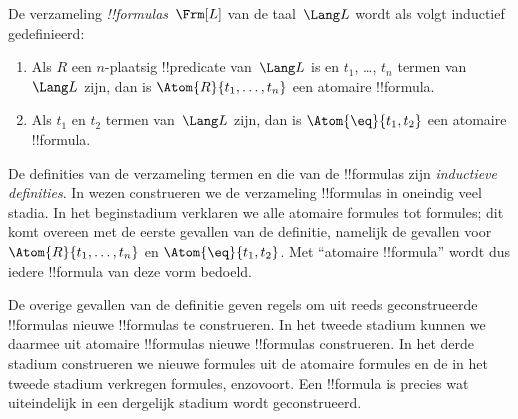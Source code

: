 \documentclass[../../../include/open-logic-section]{subfiles}
\begin{document}
\begin{defn}[Formules]
De verzameling \emph{!!{formula}s}~$\Frm[L]$ van de taal~$\Lang L$
wordt als volgt inductief gedefinieerd:
\begin{enumerate}


\item Als $R$ een $n$-plaatsig !!{predicate} van~$\Lang L$ is en $t_1$, \dots,
  $t_n$ termen van~$\Lang L$ zijn, dan is $\Atom{R}{t_1,\ldots, t_n}$ een
  atomaire !!{formula}.

\item Als $t_1$ en $t_2$ termen van~$\Lang L$ zijn, dan is $\Atom{\eq}{t_1, t_2}$
  een atomaire !!{formula}.








\end{enumerate}
\end{defn}

\begin{explain}
De definities van de verzameling termen en die van de !!{formula}s zijn
\emph{inductieve definities}. In wezen construeren we de verzameling
!!{formula}s in oneindig veel stadia. In het beginstadium verklaren we
alle atomaire formules tot formules; dit komt overeen met de eerste
gevallen van de definitie, namelijk de gevallen voor
%
%
$\Atom{R}{t_1,\dots,t_n}$ en $\Atom{\eq}{t_1,t_2}$. Met ``atomaire
!!{formula}'' wordt dus iedere !!{formula} van deze vorm bedoeld.

De overige gevallen van de definitie geven regels om uit reeds
geconstrueerde !!{formula}s nieuwe !!{formula}s te construeren. In het
tweede stadium kunnen we daarmee uit atomaire !!{formula}s nieuwe
!!{formula}s construeren. In het derde stadium construeren we nieuwe
formules uit de atomaire formules en de in het tweede stadium verkregen
formules, enzovoort. Een !!{formula} is precies wat uiteindelijk in een
dergelijk stadium wordt geconstrueerd.
\end{explain}
\end{document}
